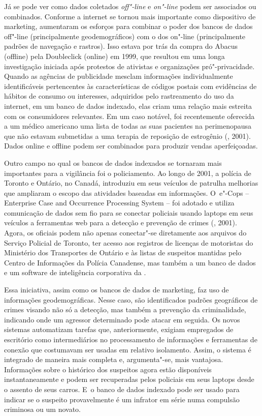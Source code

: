 Já se pode ver como dados coletados \emph{off"-line} e \emph{on"-line}
podem ser associados ou combinados. Conforme a internet se tornou mais
importante como dispositivo de marketing, aumentaram os esforços para
combinar o poder dos bancos de dados off"-line (principalmente
geodemográficos) com o dos on"-line (principalmente padrões de navegação
e rastros). Isso estava por trás da compra do Abacus (offline) pela
Doubleclick (online) em 1999, que resultou em uma longa investigação
iniciada após protestos de ativistas e organizações pró"-privacidade.
Quando as agências de publicidade mesclam informações individualmente
identificáveis pertencentes às características de códigos postais com
evidências de hábitos de consumo ou interesses, adquiridos pelo
rastreamento do uso da internet, em um banco de dados indexado, elas
criam uma relação mais estreita com os consumidores relevantes. Em um
caso notável, foi recentemente oferecida a um médico americano uma lista
de todas as suas pacientes na perimenopausa que não estavam submetidas a
uma terapia de reposição de estrogênio (, 2001). Dados online e
offline podem ser combinados para produzir vendas aperfeiçoadas.

Outro campo no qual os bancos de dados indexados se tornaram mais
importantes para a vigilância foi o policiamento. Ao longo de 2001, a
polícia de Toronto e Ontário, no Canadá, introduziu em seus veículos de
patrulha melhorias que ampliaram o escopo das atividades baseadas em
informações. O~e"-Cops -- Enterprise Case and Occurrence Processing
System -- foi adotado e utiliza comunicação de dados sem fio para se
conectar policiais usando laptops em seus veículos a ferramentas web
para a detecção e prevenção de crimes (, 2001). Agora, os oficiais
podem não apenas conectar"-se diretamente aos arquivos do Serviço
Policial de Toronto, ter acesso aos registros de licenças de motoristas
do Ministério dos Transportes de Ontário e às listas de suspeitos
mantidas pelo Centro de Informações da Polícia Canadense, mas também a
um banco de dados e um software de inteligência corporativa da .

Essa iniciativa, assim como os bancos de dados de marketing, faz uso de
informações geodemográficas. Nesse caso, são identificados padrões
geográficos de crimes visando não só a detecção, mas também a prevenção
da criminalidade, indicando onde um agressor determinado pode atacar em
seguida. Os novos sistemas automatizam tarefas que, anteriormente,
exigiam empregados de escritório como intermediários no processamento de
informações e ferramentas de conexão que costumavam ser usadas em
relativo isolamento. Assim, o sistema é integrado de maneira mais
completa e, argumenta"-se, mais vantajosa. Informações sobre o histórico
dos suspeitos agora estão disponíveis instantaneamente e podem ser
recuperadas pelos policiais em seus laptops desde o assento de seus
carros. E~o banco de dados indexado pode ser usado para indicar se o
suspeito provavelmente é um infrator em série numa compulsão criminosa
ou um novato.

